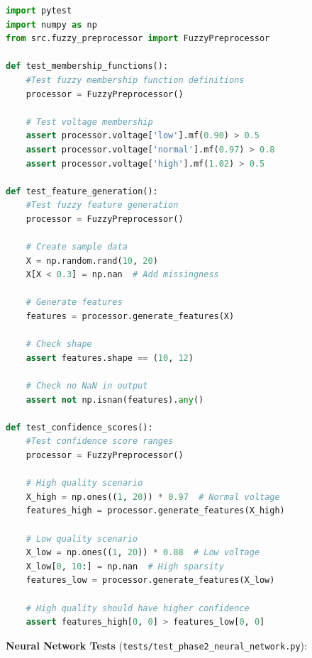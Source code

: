 \documentclass[12pt,a4paper]{report}
\begin{document}
\begin{lstlisting}[language=Python, caption={Fuzzy Preprocessor Tests}]
import pytest
import numpy as np
from src.fuzzy_preprocessor import FuzzyPreprocessor

def test_membership_functions():
    #Test fuzzy membership function definitions
    processor = FuzzyPreprocessor()
    
    # Test voltage membership
    assert processor.voltage['low'].mf(0.90) > 0.5
    assert processor.voltage['normal'].mf(0.97) > 0.8
    assert processor.voltage['high'].mf(1.02) > 0.5

def test_feature_generation():
    #Test fuzzy feature generation
    processor = FuzzyPreprocessor()
    
    # Create sample data
    X = np.random.rand(10, 20)
    X[X < 0.3] = np.nan  # Add missingness
    
    # Generate features
    features = processor.generate_features(X)
    
    # Check shape
    assert features.shape == (10, 12)
    
    # Check no NaN in output
    assert not np.isnan(features).any()

def test_confidence_scores():
    #Test confidence score ranges
    processor = FuzzyPreprocessor()
    
    # High quality scenario
    X_high = np.ones((1, 20)) * 0.97  # Normal voltage
    features_high = processor.generate_features(X_high)
    
    # Low quality scenario
    X_low = np.ones((1, 20)) * 0.88  # Low voltage
    X_low[0, 10:] = np.nan  # High sparsity
    features_low = processor.generate_features(X_low)
    
    # High quality should have higher confidence
    assert features_high[0, 0] > features_low[0, 0]
\end{lstlisting}

\textbf{Neural Network Tests} (\texttt{tests/test\_phase2\_neural\_network.py}):
\end{document}
